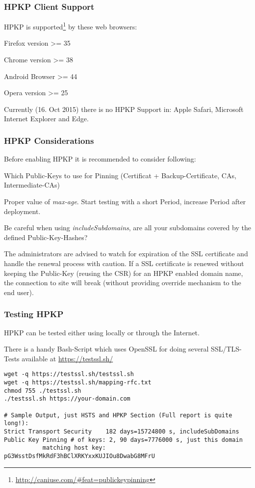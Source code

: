 \subsubsection{HPKP Client Support}
\label{subsubsection:HPKP Client Support}
HPKP is supported\footnote{\url{http://caniuse.com/\#feat=publickeypinning}} by these web browsers:
\begin{itemize*}
  \item Firefox version >= 35
	\item Chrome version >= 38
	\item Android Browser >= 44
	\item Opera version >= 25 
\end{itemize*}
Currently (16. Oct 2015) there is no HPKP Support in: Apple Safari, Microsoft Internet Explorer and Edge.

\subsubsection{HPKP Considerations}
\label{subsubsection:HPKP Considerations}
Before enabling HPKP it is recommended to consider following:
\begin{itemize*}
  \item Which Public-Keys to use for Pinning (Certificat + Backup-Certificate, CAs, Intermediate-CAs)
	\item Proper value of \emph{max-age}. Start testing with a short Period, increase Period after deployment.
	\item Be careful when using \emph{includeSubdomains}, are all your subdomains covered by the defined Public-Key-Hashes?
\end{itemize*}

The administrators are advised to watch for expiration of the SSL certificate and handle the renewal process with caution. If a SSL certificate is renewed without keeping the Public-Key (reusing the CSR) for an HPKP enabled domain name, the connection to site will break (without providing override mechanism to the end user).  

\subsubsection{Testing HPKP}
\label{subsubsection:Testing HPKP}
HPKP can be tested either using locally or through the Internet. 

There is a handy Bash-Script which uses OpenSSL for doing several SSL/TLS-Tests available at \url{https://testssl.sh/}
\begin{lstlisting}
wget -q https://testssl.sh/testssl.sh
wget -q https://testssl.sh/mapping-rfc.txt
chmod 755 ./testssl.sh
./testssl.sh https://your-domain.com

# Sample Output, just HSTS and HPKP Section (Full report is quite long!):
Strict Transport Security    182 days=15724800 s, includeSubDomains
Public Key Pinning # of keys: 2, 90 days=7776000 s, just this domain
           matching host key: pG3WsstDsfMkRdF3hBClXRKYxxKUJIOu8DwabG8MFrU
\end{lstlisting}

